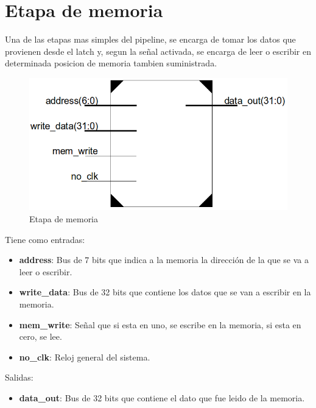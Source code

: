 \section{Etapa de memoria}
Una de las etapas mas simples del pipeline, se encarga de tomar los datos que provienen desde el latch y, segun la señal activada, se encarga de leer o escribir en determinada posicion de memoria tambien suministrada.

\begin{figure}[H]
\centering
\includegraphics[scale=0.35]{img/mem_stage}
\caption{Etapa de memoria}
\label{fig:mem_stage}
\end{figure}

Tiene como entradas:
\begin{itemize}
  \item \textbf{address}: Bus de 7 bits que indica a la memoria la direcci\'on de la que se va a leer o escribir.
  \item  \textbf{write\_data}: Bus de 32 bits que contiene los datos que se van a escribir en la memoria.
  \item \textbf{mem\_write}: Señal que si esta en uno, se escribe en la memoria, si esta en cero, se lee.
  \item \textbf{no\_clk}: Reloj general del sistema. 
\end{itemize}

Salidas:

\begin{itemize}
  \item \textbf{data\_out}: Bus de 32 bits que contiene el dato que fue leido de la memoria.
\end{itemize}